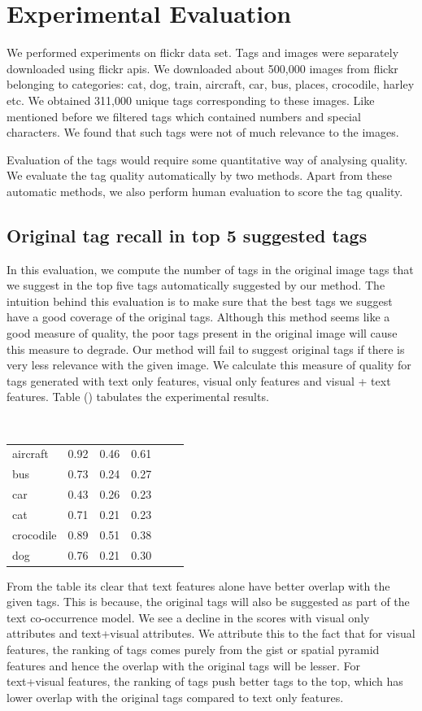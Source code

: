 \documentclass[12pt]{article}
\begin{document}
\section{Experimental Evaluation}
We performed experiments on flickr data set. Tags and images were separately downloaded using
flickr apis. We downloaded about 500,000 images from flickr belonging to categories: cat,
dog, train, aircraft, car, bus, places, crocodile, harley etc. We obtained 311,000 unique tags
corresponding to these images. Like mentioned before we filtered tags which contained numbers
and special characters. We found that such tags were not of much relevance to the images.

Evaluation of the tags would require some quantitative way of analysing quality. We evaluate
the tag quality automatically by two methods. Apart from these automatic methods, we also
perform human evaluation to score the tag quality.

\subsection{Original tag recall in top 5 suggested tags}
In this evaluation, we compute the number of tags in the original image tags that we suggest
in the top five tags automatically suggested by our method. The intuition behind this evaluation
is to make sure that the best tags we suggest have a good coverage of the original tags. Although
this method seems like a good measure of quality, the poor tags present in the original image
will cause this measure to degrade. Our method will fail to suggest original tags if there is
very less relevance with the given image. We calculate this measure of quality for tags generated
with text only features, visual only features and visual + text features. Table () tabulates the
experimental results.


\begin{table}
    \begin{tabular}{|l|l|l|l|}
aircraft & 0.92 & 0.46 & 0.61 \\
bus & 0.73 & 0.24 & 0.27 \\
car & 0.43 & 0.26 & 0.23 \\
cat & 0.71 & 0.21 & 0.23 \\
crocodile & 0.89 & 0.51 & 0.38 \\
dog & 0.76 & 0.21 & 0.30
    \end{tabular}
\end{table}

From the table its clear that text features alone have better overlap with the given tags.
This is because, the original tags will also be suggested as part of the text co-occurrence
model. We see a decline in the scores with visual only attributes and text+visual attributes.
We attribute this to the fact that for visual features, the ranking of tags comes purely from
the gist or spatial pyramid features and hence the overlap with the original tags will be lesser.
For text+visual features, the ranking of tags push better tags to the top, which has lower overlap
with the original tags compared to text only features.
\end{document}
